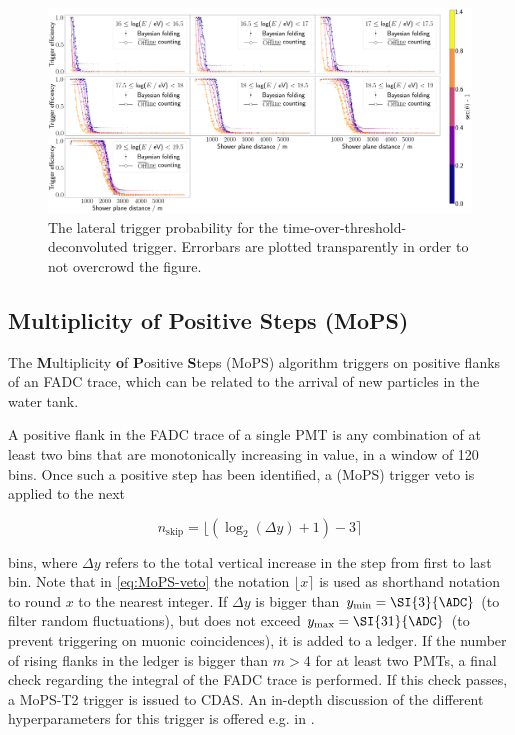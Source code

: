 \begin{figure}
	\centering
	\includegraphics[width=\textwidth]{./plots/totd_LTP_comparison.png}
	\caption{The lateral trigger probability for the time-over-threshold-deconvoluted trigger. Errorbars are plotted transparently in order to not overcrowd the 
	figure.} 
	\label{fig:totd-ltp-comparison}
\end{figure}

\subsection{Multiplicity of Positive Steps (MoPS)}
\label{ssec:multiplicity-of-positive-steps}

The \textbf{M}ultiplicity \textbf{o}f \textbf{P}ositive \textbf{S}teps (MoPS) algorithm triggers on positive flanks of an FADC trace, which can be related to the 
arrival of new particles in the water tank. 

A positive flank in the FADC trace of a single PMT is any combination of at least two bins that are monotonically increasing in value, in a window of 120 bins. 
Once such a positive step has been identified, a (MoPS) trigger veto is applied to the next 

\begin{equation}
    \label{eq:MoPS-veto}
    n_\text{skip} = \lfloor \left( \log_2(\Delta y) + 1 \right) - 3\rceil
\end{equation}

bins, where $\Delta y$ refers to the total vertical increase in the step from first to last bin. Note that in \autoref{eq:MoPS-veto} the notation 
$\lfloor x \rceil$ is used as shorthand notation to round $x$ to the nearest integer. If $\Delta y$ is bigger than $y_\text{min} = \SI{3}{\ADC}$ (to filter random 
fluctuations), but does not exceed $y_\text{max} = \SI{31}{\ADC}$ (to prevent triggering on muonic coincidences), it is added to a ledger. If the number of rising 
flanks in the ledger is bigger than $m>4$ for at least two PMTs, a final check regarding the integral of the FADC trace is performed. If this check passes, a 
MoPS-T2 trigger is issued to CDAS. An in-depth discussion of the different hyperparameters for this trigger is offered e.g. in \cite{gapMoPS}.

